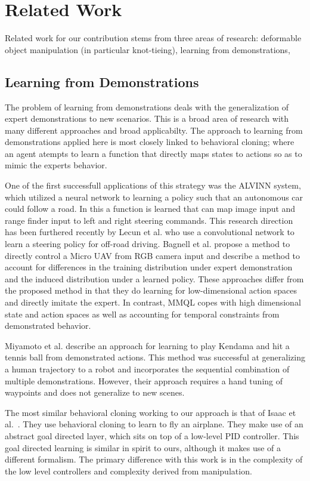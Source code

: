 \section{Related Work}
Related work for our contribution stems from three areas of research: deformable object manipulation (in particular knot-tieing), learning from demonstrations, 

\subsection{Learning from Demonstrations}
The problem of learning from demonstrations deals with the generalization of expert demonstrations to new scenarios. 
This is a broad area of research with many different approaches and broad applicabilty.
The approach to learning from demonstrations applied here is most closely linked to behavioral cloning; where an agent atempts to learn a function that directly maps states to actions so as to mimic the experts behavior. 

One of the first successfull applications of this strategy was the ALVINN system, which utilized a neural network to learning a policy such that an autonomous car could follow a road.
In this a function is learned that can map image input and range finder input to left and right steering commands. 
This research direction has been furthered recently by Lecun et al.  who use a convolutional network to learn a steering policy for off-road driving.
Bagnell et al. propose a method to directly control a Micro UAV from RGB camera input and describe a method to account for differences in the training distribution under expert demonstration and the induced distribution under a learned policy. 
These approaches differ from the proposed method in that they do learning for low-dimensional action spaces and directly imitate the expert.
In contrast, MMQL copes with high dimensional state and action spaces as well as accounting for temporal constraints from demonstrated behavior.

Miyamoto et al.  describe an approach for learning to play Kendama and hit a tennis ball from demonstrated actions. 
This method was successful at generalizing a human trajectory to a robot and incorporates the sequential combination of multiple demonstrations.
However, their approach requires a hand tuning of waypoints and does not generalize to new scenes.


The most similar behavioral cloning working to our approach is that of Isaac et al.~. 
They use behavioral cloning to learn to fly an airplane.
They make use of an abstract goal directed layer, which sits on top of a low-level PID controller.
This goal directed learning is similar in spirit to ours, although it makes use of a different formalism.
The primary difference with this work is in the complexity of the low level controllers and complexity derived from manipulation.


